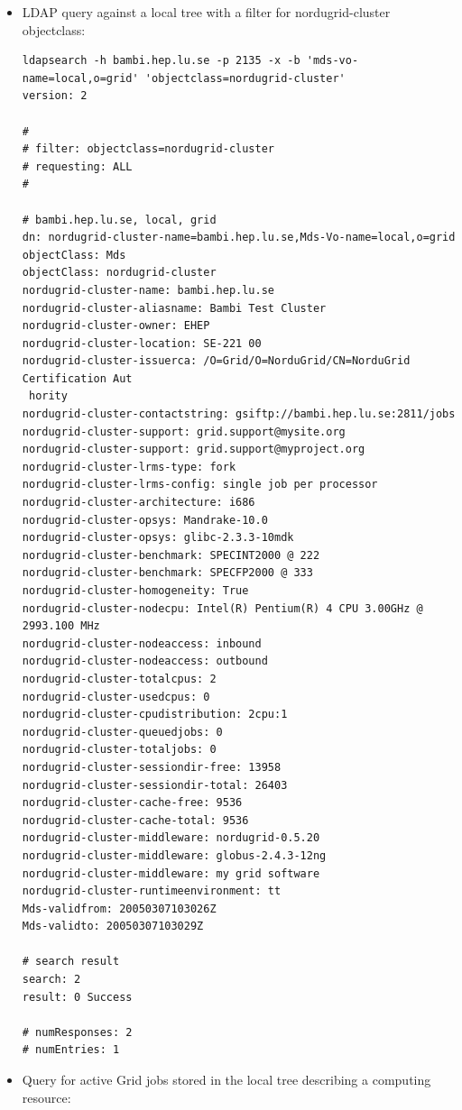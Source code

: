 \documentclass{article}
\begin{document}
\begin{itemize}

\item
LDAP query against a local tree with a filter for nordugrid-cluster objectclass:

\tiny
\begin{verbatim}
ldapsearch -h bambi.hep.lu.se -p 2135 -x -b 'mds-vo-name=local,o=grid' 'objectclass=nordugrid-cluster'
version: 2

#
# filter: objectclass=nordugrid-cluster
# requesting: ALL
#

# bambi.hep.lu.se, local, grid
dn: nordugrid-cluster-name=bambi.hep.lu.se,Mds-Vo-name=local,o=grid
objectClass: Mds
objectClass: nordugrid-cluster
nordugrid-cluster-name: bambi.hep.lu.se
nordugrid-cluster-aliasname: Bambi Test Cluster
nordugrid-cluster-owner: EHEP
nordugrid-cluster-location: SE-221 00
nordugrid-cluster-issuerca: /O=Grid/O=NorduGrid/CN=NorduGrid Certification Aut
 hority
nordugrid-cluster-contactstring: gsiftp://bambi.hep.lu.se:2811/jobs
nordugrid-cluster-support: grid.support@mysite.org
nordugrid-cluster-support: grid.support@myproject.org
nordugrid-cluster-lrms-type: fork
nordugrid-cluster-lrms-config: single job per processor
nordugrid-cluster-architecture: i686
nordugrid-cluster-opsys: Mandrake-10.0
nordugrid-cluster-opsys: glibc-2.3.3-10mdk
nordugrid-cluster-benchmark: SPECINT2000 @ 222
nordugrid-cluster-benchmark: SPECFP2000 @ 333
nordugrid-cluster-homogeneity: True
nordugrid-cluster-nodecpu: Intel(R) Pentium(R) 4 CPU 3.00GHz @ 2993.100 MHz
nordugrid-cluster-nodeaccess: inbound
nordugrid-cluster-nodeaccess: outbound
nordugrid-cluster-totalcpus: 2
nordugrid-cluster-usedcpus: 0
nordugrid-cluster-cpudistribution: 2cpu:1
nordugrid-cluster-queuedjobs: 0
nordugrid-cluster-totaljobs: 0
nordugrid-cluster-sessiondir-free: 13958
nordugrid-cluster-sessiondir-total: 26403
nordugrid-cluster-cache-free: 9536
nordugrid-cluster-cache-total: 9536
nordugrid-cluster-middleware: nordugrid-0.5.20
nordugrid-cluster-middleware: globus-2.4.3-12ng
nordugrid-cluster-middleware: my grid software
nordugrid-cluster-runtimeenvironment: tt
Mds-validfrom: 20050307103026Z
Mds-validto: 20050307103029Z

# search result
search: 2
result: 0 Success

# numResponses: 2
# numEntries: 1
\end{verbatim}
\normalsize

\item Query for active Grid jobs stored in the local tree describing a computing resource:


\end{itemize}
\end{document}
